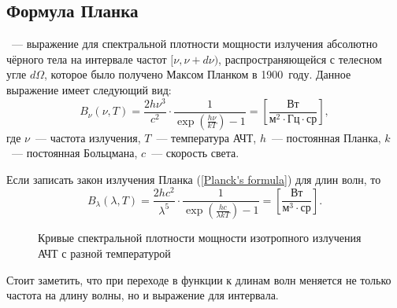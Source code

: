 \subsection{Формула Планка}
\label{sec:planck-law}
~--- выражение для спектральной плотности мощности излучения абсолютно чёрного тела на интервале частот $[\nu, \nu + d \nu)$, распространяющейся с телесном угле $d\Omega$, которое было получено Максом Планком в 1900~году. Данное выражение имеет следующий вид:
\begin{equation}\label{Planck's formula}
B_\nu(\nu,T)=\frac{2h\nu^3}{c^2}\cdot \frac{1}{\exp\left(\frac{h\nu}{kT}\right)-1} = \left[ \frac{\text{Вт}}{\text{м}^2 \cdot \text{Гц} \cdot \text{ср}}\right],
\end{equation}
где $\nu$~--- частота излучения, $T$~--- температура АЧТ, $h$~--- постоянная Планка, $k$~--- постоянная Больцмана, $c$~--- скорость света.

Если записать закон излучения Планка (\ref{Planck's formula}) для длин волн, то
\begin{equation}\label{Planck's formula2}
B_\lambda(\lambda,T)=\frac{2hc^2}{\lambda^5} \cdot \frac{1}{\exp\left(\frac{hc}{\lambda kT}\right)-1} = \left[ \frac{\text{Вт}}{\text{м}^3 \cdot \text{ср}}\right].
\end{equation}
\begin{wrapfigure}[15]{l}{.6\tw}
\centering
\vspace{-.9pc}
\caption{Кривые спектральной плотности мощности изотропного излучения АЧТ с разной температурой}\label{pic:wien-law}
\end{wrapfigure}
Стоит заметить, что при переходе в функции к длинам волн меняется не только частота на длину волны, но и выражение для интервала. 

